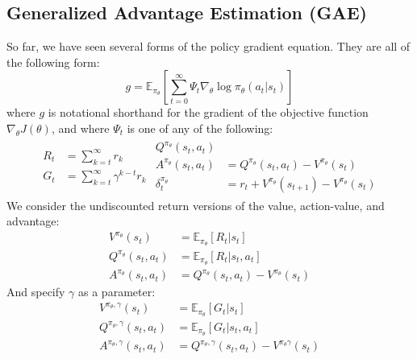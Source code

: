 \documentclass[journal, onecolumn, 12pt, draftclsnofoot]{IEEEtran}
\begin{document}
		\subsection{Generalized Advantage Estimation (GAE)}
		\par So far, we have seen several forms of the policy gradient equation. They are all of the following form:
		\begin{equation}
			\label{eqn:generalized-gradient}
			g = \mathbb{E}_{\pi_\theta} \left[ \sum_{t=0}^\infty \Psi_t \nabla_\theta \log \pi_\theta(a_t \big\vert s_t) \right]
		\end{equation}
		where $g$ is notational shorthand for the gradient of the objective function $\nabla_\theta J(\theta)$, and where $\Psi_t$ is one of any of the following:
		\begin{align}
			\label{eqn:psi-options}
			\begin{split}
				R_t &= \sum_{k=t}^\infty r_k\\
				G_t &= \sum_{k=t}^\infty \gamma^{k-t}r_k
			\end{split}
			\begin{split}
				Q^{\pi_\theta}(s_t, a_t) \\
				A^{\pi_\theta}(s_t, a_t) &= Q^{\pi_\theta}(s_t, a_t) - V^{\pi_\theta}(s_t) \\
				\delta_t^{\pi_\theta} &= r_t + V^{\pi_\theta}(s_{t+1}) - V^{\pi_\theta}(s_t)
			\end{split}
		\end{align}
		We consider the undiscounted return versions of the value, action-value, and advantage:
		\begin{align*}
					V^{\pi_\theta}(s_t) &= \mathbb{E}_{\pi_\theta} \left[ R_t \big\vert s_t \right] \\
					Q^{\pi_\theta}(s_t, a_t) &= \mathbb{E}_{\pi_\theta} \left[ R_t \big\vert s_t, a_t \right] \\
					A^{\pi_\theta}(s_t, a_t) &= Q^{\pi_\theta}(s_t, a_t) - V^{\pi_\theta}(s_t)
		\end{align*}
		And specify $\gamma$ as a parameter:
		\begin{align*}
					V^{\pi_\theta, \gamma}(s_t) &= \mathbb{E}_{\pi_\theta} \left[ G_t \big\vert s_t \right] \\
					Q^{\pi_\theta, \gamma}(s_t, a_t) &= \mathbb{E}_{\pi_\theta} \left[ G_t \big\vert s_t, a_t \right] \\
					A^{\pi_\theta, \gamma}(s_t, a_t) &= Q^{\pi_\theta, \gamma}(s_t, a_t) - V^{\pi_\theta \gamma}(s_t)
		\end{align*}
\end{document}
